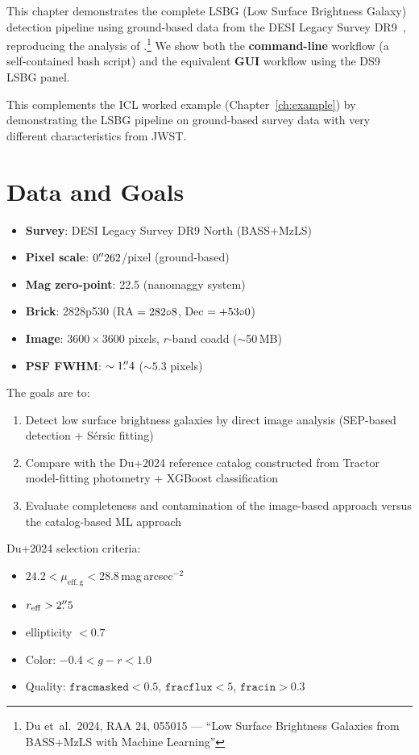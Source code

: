 \documentclass[11pt,fleqn]{book}
\begin{document}
This chapter demonstrates the complete LSBG (Low Surface Brightness Galaxy)
detection pipeline using ground-based data from the DESI Legacy Survey
DR9~\cite{dey2019}, reproducing the analysis of
\textcite{du2024}.\footnote{Du et~al.\ 2024, RAA 24, 055015 --- ``Low Surface
Brightness Galaxies from BASS+MzLS with Machine Learning''}
We show both the \textbf{command-line} workflow (a self-contained bash script)
and the equivalent \textbf{GUI} workflow using the DS9 LSBG panel.

This complements the ICL worked example (Chapter~\ref{ch:example}) by
demonstrating the LSBG pipeline on ground-based survey data with very
different characteristics from JWST.

\section{Data and Goals}

\begin{itemize}
  \item \textbf{Survey}: DESI Legacy Survey DR9 North (BASS+MzLS)~\cite{dey2019}
  \item \textbf{Pixel scale}: $0\rlap{.}{''}262$/pixel (ground-based)
  \item \textbf{Mag zero-point}: 22.5 (nanomaggy system)
  \item \textbf{Brick}: 2828p530 (RA${}=282\rlap{.}{\circ}8$,
        Dec${}=+53\rlap{.}{\circ}0$)
  \item \textbf{Image}: $3600\times3600$ pixels, $r$-band coadd ($\sim$50\,MB)
  \item \textbf{PSF FWHM}: $\sim1\rlap{.}{''}4$ ($\sim5.3$ pixels)
\end{itemize}

\noindent
The goals are to:
\begin{enumerate}
  \item Detect low surface brightness galaxies by direct image analysis
        (SEP-based detection + S\'ersic fitting)
  \item Compare with the Du+2024 reference catalog constructed from
        Tractor model-fitting photometry + XGBoost classification
  \item Evaluate completeness and contamination of the image-based
        approach versus the catalog-based ML approach
\end{enumerate}

\noindent
Du+2024 selection criteria:
\begin{itemize}
  \item $24.2 < \mu_\mathrm{eff,g} < 28.8$\,mag\,arcsec$^{-2}$
  \item $r_\mathrm{eff} > 2\rlap{.}{''}5$
  \item ellipticity $< 0.7$
  \item Color: $-0.4 < g-r < 1.0$
  \item Quality: $\texttt{fracmasked} < 0.5$, $\texttt{fracflux} < 5$,
        $\texttt{fracin} > 0.3$
\end{itemize}
\end{document}
